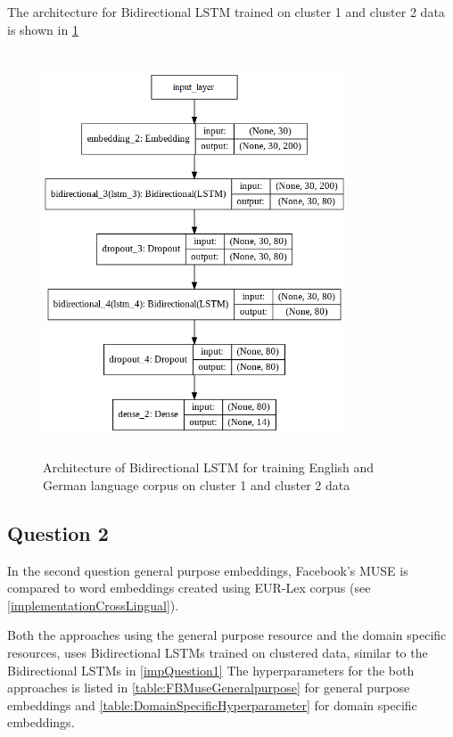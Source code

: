 The architecture for Bidirectional LSTM trained on cluster 1 and cluster 2 data is shown in \ref{fig:cluster1&2LSTM}



\begin{figure}[!ht]
    \centering
    \includegraphics[width=9cm, height=12cm]{pics/LSTM_LEGALEMB_CLUSTER_1.png}
    \captionsetup{justification=centering,margin=2cm}
    \caption{Architecture of Bidirectional LSTM for training English and German language corpus on cluster 1 and cluster 2 data}
    \label{fig:cluster1&2LSTM}
\end{figure}


\clearpage

\subsection{Question 2}
In the second question general purpose embeddings, Facebook's MUSE is compared to word embeddings created using EUR-Lex corpus (see \ref{implementationCrossLingual}).

Both the approaches using the general purpose resource and the domain specific resources, uses Bidirectional LSTMs trained on clustered data, similar to the Bidirectional LSTMs in \ref{impQuestion1}
The hyperparameters for the both approaches is listed in \ref{table:FBMuseGeneralpurpose} for general purpose embeddings and \ref{table:DomainSpecificHyperparameter} for domain specific embeddings.

